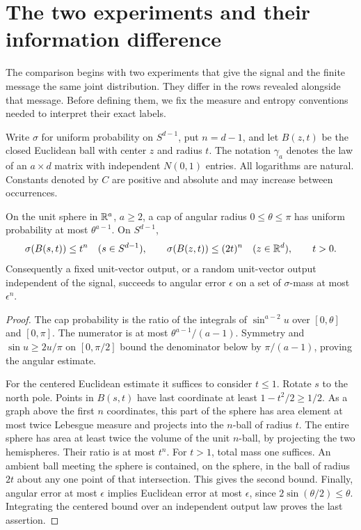 \section{The two experiments and their information difference}
\label{sec:r-experiments}

The comparison begins with two experiments that give the signal and
the finite message the same joint distribution.  They differ in the
rows revealed alongside that message.  Before defining them, we fix
the measure and entropy conventions needed to interpret their exact
labels.

Write \(\sigma\) for uniform probability on \(S^{d-1}\), put \(n=d-1\),
and let \(B(z,t)\) be the closed Euclidean ball with center \(z\) and
radius \(t\).  The notation \(\gamma_a\) denotes the law of an
\(a\times d\) matrix with independent \(N(0,1)\) entries.  All
logarithms are natural.  Constants denoted by \(C\) are positive and
absolute and may increase between occurrences.

\begin{lemma}\label{lem:r-caps}
On the unit sphere in \(\mathbb R^a\), \(a\ge2\), a cap of angular radius
\(0\le\theta\le\pi\) has uniform probability at most
\(\theta^{a-1}\).  On \(S^{d-1}\),
\[
 \sigma(B(s,t))\le t^n\quad(s\in S^{d-1}),\qquad
 \sigma(B(z,t))\le(2t)^n\quad(z\in\mathbb R^d),\qquad t>0.
\]
Consequently a fixed unit-vector output, or a random unit-vector
output independent of the signal, succeeds to angular error
\(\epsilon\) on a set of \(\sigma\)-mass at most \(\epsilon^n\).
\end{lemma}

\begin{proof}
The cap probability is the ratio of the integrals of
\(\sin^{a-2}u\) over \([0,\theta]\) and \([0,\pi]\).  The numerator
is at most \(\theta^{a-1}/(a-1)\).  Symmetry and
\(\sin u\ge2u/\pi\) on \([0,\pi/2]\) bound the denominator below by
\(\pi/(a-1)\), proving the angular estimate.

For the centered Euclidean estimate it suffices to consider \(t\le1\).
Rotate \(s\) to the north pole.  Points in \(B(s,t)\) have last
coordinate at least \(1-t^2/2\ge1/2\).  As a graph above the first
\(n\) coordinates, this part of the sphere has area element at most
twice Lebesgue measure and projects into the \(n\)-ball of radius
\(t\).  The entire sphere has area at least twice the volume of the
unit \(n\)-ball, by projecting the two hemispheres.  Their ratio is
at most \(t^n\).  For \(t>1\), total mass one suffices.  An ambient
ball meeting the sphere is contained, on the sphere, in the ball of
radius \(2t\) about any one point of that intersection.  This gives
the second bound.  Finally, angular error at most \(\epsilon\)
implies Euclidean error at most \(\epsilon\), since
\(2\sin(\theta/2)\le\theta\).  Integrating the centered bound over
an independent output law proves the last assertion.
\end{proof}

